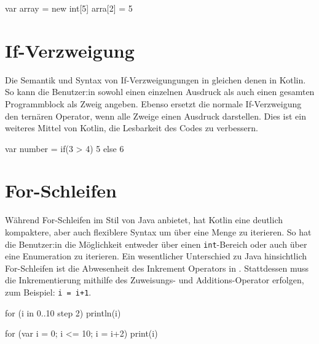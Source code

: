 \begin{ToyaCode}[numbers=none, caption={Felder in \toya}]
var array = new int[5]
arra[2] = 5
\end{ToyaCode}

\section{If-Verzweigung}

Die Semantik und Syntax von If-Verzweigungungen in \toya gleichen denen in Kotlin. So kann die Benutzer:in sowohl einen einzelnen Ausdruck als auch einen gesamten Programmblock als Zweig angeben. Ebenso ersetzt die normale If-Verzweigung den ternären Operator, wenn alle Zweige einen Ausdruck darstellen. Dies ist ein weiteres Mittel von Kotlin, die Lesbarkeit des Codes zu verbessern. 

\begin{KotlinCode}[numbers=none, caption={If-Ausdruck, der sowohl in Kotlin, als auch in \toya übersetzt}]
var number = if(3 > 4) 5 else 6
\end{KotlinCode}

\section{For-Schleifen}

Während \toya For-Schleifen im Stil von Java anbietet, hat Kotlin eine deutlich kompaktere, aber auch flexiblere Syntax um über eine Menge zu iterieren. So hat die Benutzer:in die Möglichkeit entweder über einen \texttt{int}-Bereich oder auch über eine Enumeration zu iterieren. Ein wesentlicher Unterschied zu Java hinsichtlich For-Schleifen ist die Abwesenheit des Inkrement Operators in \toya. Stattdessen muss die Inkrementierung mithilfe des Zuweisungs- und Additions-Operator erfolgen, zum Beispiel: \texttt{i = i+1}.

\begin{KotlinCode}[numbers=none, caption={Einfache For-Schleife in Kotlin}]
for (i in 0..10 step 2) {
    println(i)
}
\end{KotlinCode}

\begin{ToyaCode}[numbers=none, caption={Einfache For-Schleife in toya}]
for (var i = 0; i <= 10; i = i+2) {
    print(i)
}
\end{ToyaCode}